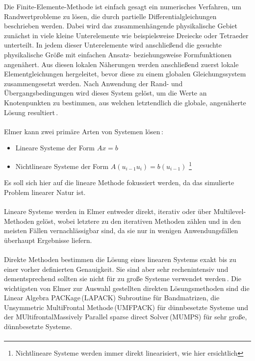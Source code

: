 \documentclass[12pt, a4paper]{article}
\begin{document}
Die Finite-Elemente-Methode ist einfach gesagt ein numerisches Verfahren, um Randwertprobleme zu lösen, die durch partielle Differentialgleichungen beschrieben werden. \newline
Dabei wird das zusammenhängende physikalische Gebiet zunächst in viele kleine Unterelemente wie beispielsweise Dreiecke oder Tetraeder unterteilt. In jedem dieser Unterelemente wird anschließend die gesuchte physikalische Größe mit einfachen Ansatz- beziehungsweise Formfunktionen angenähert. Aus diesen lokalen Näherungen werden anschließend zuerst lokale Elementgleichungen hergeleitet, bevor diese zu einem globalen Gleichungssystem zusammengesetzt werden. Nach Anwendung der Rand- und Übergangsbedingungen wird dieses System gelöst, um die Werte an Knotenpunkten zu bestimmen, aus welchen letztendlich die globale, angenäherte Lösung resultiert\,\cite{sukumar07}.\paragraph{}

Elmer kann zwei primäre Arten von Systemen lösen\,\cite{elmerSolve}:
\begin{itemize}
	\item Lineare Systeme der Form $Ax=b$
	\item Nichtlineare Systeme der Form $A(u_{i-1}u_i)=b(u_{i-1})$ \footnote{Nichtlineare Systeme werden immer direkt linearisiert, wie hier ersichtlich}
\end{itemize}
Es soll sich hier auf die lineare Methode fokussiert werden, da das simulierte Problem  linearer Natur ist.\paragraph{}

Lineare Systeme werden in Elmer entweder direkt, iterativ oder über Multilevel-Methoden gelöst, wobei letztere zu den iterativen Methoden zählen und in den meisten Fällen vernachlässigbar sind, da sie nur in wenigen Anwendungsfällen überhaupt Ergebnisse liefern.\paragraph{}

Direkte Methoden bestimmen die Lösung eines linearen Systems exakt bis zu einer vorher definierten Genauigkeit. Sie sind aber sehr rechenintensiv und dementsprechend sollten sie nicht für zu große Systeme verwendet werden\,\cite{elmerSolve}.\newline
Die wichtigsten von Elmer zur Auswahl gestellten direkten Lösungsmethoden sind die Linear Algebra PACKage\,(LAPACK) Subroutine für Bandmatrizen, die Unsymmetric \newline MultiFrontal Methode\,(UMFPACK) für dünnbesetzte Systeme und der MUltifrontal\newline Massively Parallel sparse direct Solver\,(MUMPS) für sehr große, dünnbesetzte Systeme.\paragraph{}
\end{document}
